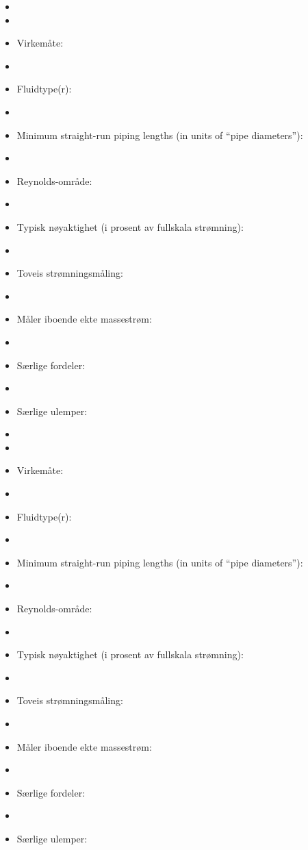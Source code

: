 \begin{itemize}
\goodbreak
\item{} 
\vskip 5pt
\item\item{} Virkemåte:
\vskip 5pt
\item\item{} Fluidtype(r):
\vskip 5pt
\item\item{} Minimum straight-run piping lengths (in units of ``pipe diameters''):
\vskip 5pt
\item\item{} Reynolds-område:
\vskip 5pt
\item\item{} Typisk nøyaktighet (i prosent av fullskala strømning):
\vskip 5pt
\item\item{} Toveis strømningsmåling:
\vskip 5pt
\item\item{} Måler iboende ekte massestrøm:
\vskip 5pt
\item\item{} Særlige fordeler:
\vskip 5pt
\item\item{} Særlige ulemper:
\end{itemize}


\begin{itemize}
\goodbreak
\item{} 
\vskip 5pt
\item\item{} Virkemåte:
\vskip 5pt
\item\item{} Fluidtype(r):
\vskip 5pt
\item\item{} Minimum straight-run piping lengths (in units of ``pipe diameters''):
\vskip 5pt
\item\item{} Reynolds-område:
\vskip 5pt
\item\item{} Typisk nøyaktighet (i prosent av fullskala strømning):
\vskip 5pt
\item\item{} Toveis strømningsmåling:
\vskip 5pt
\item\item{} Måler iboende ekte massestrøm:
\vskip 5pt
\item\item{} Særlige fordeler:
\vskip 5pt
\item\item{} Særlige ulemper: 
\end{itemize}

